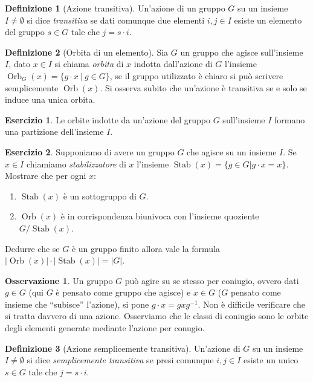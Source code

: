 \documentclass[11pt]{article}
\theoremstyle{plain}
\theoremstyle{definition}
\newtheorem{defn}{Definizione}[section]
\newtheorem{exercise}{Esercizio}[section]
\newtheorem*{rem}{Osservazione}
\theoremstyle{remark}
\DeclareMathOperator{\Orb}{Orb}
\DeclareMathOperator{\Stab}{Stab}
\begin{document}
\begin{defn}[Azione transitiva]
Un'azione di un gruppo $G$ su un insieme $I\neq \emptyset$ si dice \emph{transitiva} se dati comunque due elementi $i,j\in I$ esiste un elemento del gruppo $s\in G$ tale che $j=s\cdot i$.
\label{defn:azione transitiva}
\end{defn}


\begin{defn}[Orbita di un elemento]
Sia $G$ un gruppo che agisce sull'insieme $I$, dato $x\in I$ si chiama \textit{orbita} di $x$ indotta dall'azione di $G$ l'insieme $\Orb_{G}(x)=\{ g\cdot x\ |\ g\in G \}$, se il gruppo utilizzato è chiaro si può scrivere semplicemente $\Orb(x)$. Si osserva subito che un'azione è transitiva se e solo se induce una unica orbita.
\label{defn:orbita}
\end{defn}

\begin{exercise}
Le orbite indotte da un'azione del gruppo $G$ sull'insieme $I$ formano una partizione dell'insieme $I$. 
\end{exercise}

\begin{exercise}
Supponiamo di avere un gruppo $G$ che agisce su un insieme $I$. Se $x\in I$ chiamiamo \emph{stabilizzatore} di $x$ l'insieme
$\Stab(x) = \{g\in G| g\cdot x = x\}$.
Mostrare che per ogni $x$:
\begin{enumerate}
\item $\Stab(x)$ è un sottogruppo di $G$.
\item $\Orb(x)$ è in corrispondenza biunivoca con l'insieme quoziente $G/\Stab(x)$.
\end{enumerate}
Dedurre che se $G$ è un gruppo finito allora vale la formula $|\Orb(x)| \cdot |\Stab(x)| = |G|$.
\end{exercise}



\begin{rem}
	Un gruppo $G$ può agire su se stesso per coniugio, ovvero dati $g\in G$ (qui $G$ è pensato come gruppo che agisce) e $x\in G$ ($G$ pensato come insieme che ``subisce'' l'azione),
	si pone $g\cdot x = gxg^{-1}$. Non è difficile verificare che si tratta davvero di una azione.
	Osserviamo che le classi di coniugio sono le orbite degli elementi generate mediante l'azione per conugio.
\end{rem}




\begin{defn}[Azione semplicemente transitiva]
Un'azione di $G$ su un insieme $I\neq \emptyset$ si dice \emph{semplicemente transitiva}
se presi comunque $i,j\in I$ esiste un unico $s\in G$ tale che $j=s\cdot i$.
\end{defn}
\end{document}
